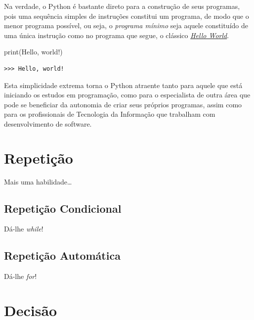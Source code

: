 \documentclass[
]{book}
\newenvironment{Shaded}{\begin{snugshade}}{\end{snugshade}}
\newcommand{\BuiltInTok}[1]{#1}
\newcommand{\NormalTok}[1]{#1}
\newcommand{\StringTok}[1]{\textcolor[rgb]{0.31,0.60,0.02}{#1}}
\begin{document}
Na verdade, o Python é bastante direto para a construção de seus programas, pois uma sequência simples de instruções constitui um programa, de modo que o menor programa possível, ou seja, o \emph{programa mínimo} seja aquele constituído de uma única instrução como no programa que segue, o clássico \href{https://www.thesoftwareguild.com/blog/the-history-of-hello-world/}{\emph{Hello World}}.

\begin{Shaded}
\begin{Highlighting}[]
\BuiltInTok{print}\NormalTok{(}\StringTok{\textquotesingle{}Hello, world!\textquotesingle{}}\NormalTok{)}
\end{Highlighting}
\end{Shaded}

\begin{verbatim}
>>> Hello, world!
\end{verbatim}

Esta simplicidade extrema torna o Python atraente tanto para aquele que está iniciando os estudos em programação, como para o especialista de outra área que pode se beneficiar da autonomia de criar seus próprios programas, assim como para os profissionais de Tecnologia da Informação que trabalham com desenvolvimento de software.

\hypertarget{repet}{%
\chapter{Repetição}\label{repet}}

Mais uma habilidade\ldots{}

\hypertarget{repet-while}{%
\section{Repetição Condicional}\label{repet-while}}

Dá-lhe \emph{while}!

\hypertarget{repet-for}{%
\section{Repetição Automática}\label{repet-for}}

Dá-lhe \emph{for}!

\hypertarget{decis}{%
\chapter{Decisão}\label{decis}}
\end{document}

